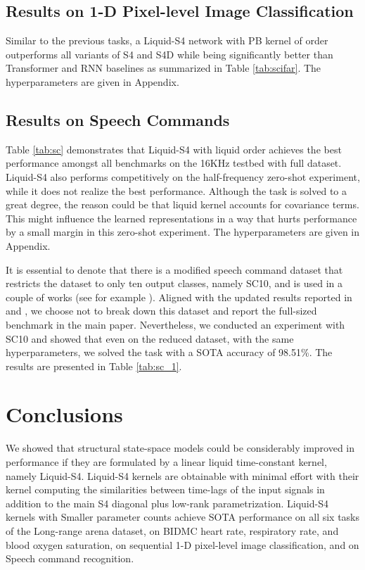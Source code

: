 \documentclass{MITcsail}
\begin{document}
\subsection{Results on 1-D Pixel-level Image Classification}
Similar to the previous tasks, a Liquid-S4 network with PB kernel of order  outperforms all variants of S4 and S4D while being significantly better than Transformer and RNN baselines as summarized in Table \ref{tab:scifar}. The hyperparameters are given in Appendix.


\subsection{Results on Speech Commands}
Table \ref{tab:sc} demonstrates that Liquid-S4 with liquid order  achieves the best performance amongst all benchmarks on the 16KHz testbed with full dataset. Liquid-S4 also performs competitively on the half-frequency zero-shot experiment, while it does not realize the best performance. Although the task is solved to a great degree, the reason could be that liquid kernel accounts for covariance terms. This might influence the learned representations in a way that hurts performance by a small margin in this zero-shot experiment. The hyperparameters are given in Appendix.

It is essential to denote that there is a modified speech command dataset that restricts the dataset to only ten output classes, namely SC10, and is used in a couple of works (see for example \protect\citep{kidger2020neural,gu2021combining,romero2021ckconv,romero2021flexconv}). Aligned with the updated results reported in \citep{gu2022efficiently} and \citep{gu2022parameterization}, we choose not to break down this dataset and report the full-sized benchmark in the main paper. Nevertheless, we conducted an experiment with SC10 and showed that even on the reduced dataset, with the same hyperparameters, we solved the task with a SOTA accuracy of 98.51\%. The results are presented in Table \ref{tab:sc_1}.

\section{Conclusions}
We showed that structural state-space models could be considerably improved in performance if they are formulated by a linear liquid time-constant kernel, namely Liquid-S4. Liquid-S4 kernels are obtainable with minimal effort with their kernel computing the similarities between time-lags of the input signals in addition to the main S4 diagonal plus low-rank parametrization. Liquid-S4 kernels with Smaller parameter counts achieve SOTA performance on all six tasks of the Long-range arena dataset, on BIDMC heart rate, respiratory rate, and blood oxygen saturation, on sequential 1-D pixel-level image classification, and on Speech command recognition. 
\end{document}
